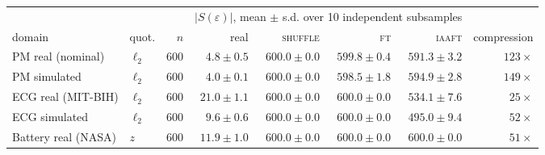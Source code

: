 \begin{tabular}{llrrrrrr}
\toprule
& & & \multicolumn{4}{c}{$|S(\varepsilon)|$, mean $\pm$ s.d. over 10 independent subsamples} & \\
\cmidrule(lr){4-7}
domain & quot. & $n$ & real & \textsc{shuffle} & \textsc{ft} & \textsc{iaaft} & compression \\
\midrule
PM real (nominal) & $\ell_2$ & 600 & $4.8 \pm 0.5$ & $600.0 \pm 0.0$ & $599.8 \pm 0.4$ & $591.3 \pm 3.2$ & $123\times$ \\
PM simulated & $\ell_2$ & 600 & $4.0 \pm 0.1$ & $600.0 \pm 0.0$ & $598.5 \pm 1.8$ & $594.9 \pm 2.8$ & $149\times$ \\
ECG real (MIT-BIH) & $\ell_2$ & 600 & $21.0 \pm 1.1$ & $600.0 \pm 0.0$ & $600.0 \pm 0.0$ & $534.1 \pm 7.6$ & $25\times$ \\
ECG simulated & $\ell_2$ & 600 & $9.6 \pm 0.6$ & $600.0 \pm 0.0$ & $600.0 \pm 0.0$ & $495.0 \pm 9.4$ & $52\times$ \\
Battery real (NASA) & $z$ & 600 & $11.9 \pm 1.0$ & $600.0 \pm 0.0$ & $600.0 \pm 0.0$ & $600.0 \pm 0.0$ & $51\times$ \\
\bottomrule
\end{tabular}
